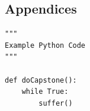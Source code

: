 \documentclass[12pt]{article}
\begin{document}
\begin{spacing}{1.9}
\appendix
\section{Appendices}
\begin{verbatim}
"""
Example Python Code
"""

def doCapstone():
    while True:
        suffer()
\end{verbatim}

\end{spacing}
\end{document}
